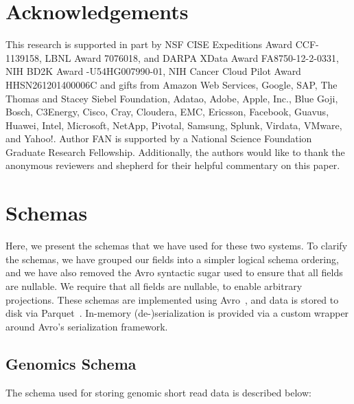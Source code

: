 \documentclass{acm_proc_article-sp}
\begin{document}
\section{Acknowledgements}

This research is supported in part by NSF CISE Expeditions Award CCF-1139158, LBNL Award 7076018, and DARPA XData Award FA8750-12-2-0331, NIH BD2K Award -U54HG007990-01, NIH Cancer Cloud Pilot Award \linebreak HHSN261201400006C and gifts from Amazon Web Services, Google, SAP,  The Thomas and Stacey Siebel Foundation, Adatao, Adobe, Apple, Inc., Blue Goji, Bosch, C3Energy, Cisco, Cray, Cloudera, EMC, Ericsson, Facebook, Guavus, Huawei, Intel, Microsoft, NetApp, Pivotal, Samsung, Splunk, Virdata, VMware, and Yahoo!. Author FAN is supported by a National Science Foundation Graduate Research Fellowship. Additionally, the authors would like to thank the anonymous reviewers and shepherd for their helpful commentary on this paper.

\balance

\clearpage

\appendix




\section{Schemas}
\label{sec:schema}

Here, we present the schemas that we have used for these two systems. To clarify the schemas, we
have grouped our fields into a simpler logical schema ordering, and we have also removed the Avro syntactic
sugar used to ensure that all fields are nullable. We require that all fields are nullable, to enable arbitrary
projections. These schemas are implemented using Avro~\cite{avro}, and data is stored to disk via
Parquet~\cite{parquet}. In-memory (de-)serialization is provided via a custom wrapper around Avro's
serialization framework.

\subsection{Genomics Schema}
\label{sec:genomics-schema}

The schema used for storing genomic short read data is described below:
\end{document}
